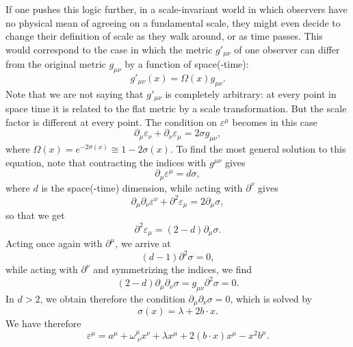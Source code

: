 \documentclass[a4paper,12pt]{article}
\numberwithin{equation}{section}
\begin{document}
If one pushes this logic further, in a scale-invariant world in which observers have no physical mean of agreeing on a fundamental scale, they might even decide to change their definition of scale as they walk around, or as time passes. This would correspond to the case in which the metric $g'_{\mu\nu}$ of one observer can differ from the original metric $g_{\mu\nu}$ by a function of space(-time):
\begin{equation}
	g'_{\mu\nu}(x) = \Omega(x) g_{\mu\nu}.
\end{equation}
Note that we are not saying that $g'_{\mu\nu}$ is completely arbitrary: at every point in space time it is related to the flat metric by a scale transformation. But the scale factor is different at every point.
The condition on $\varepsilon^\mu$ becomes in this case
\begin{equation}
	\partial_\mu \varepsilon_\nu
	+ \partial_\nu \varepsilon_\mu = 2 \sigma g_{\mu\nu},
	\label{eq:conformalkillingeq}
\end{equation}
where $\Omega(x) = e^{-2 \sigma(x)} \cong 1 - 2\sigma(x)$. To find the most general solution to this equation, note that contracting the indices with $g^{\mu\nu}$ gives
\begin{equation}
	\partial_\mu \varepsilon^\mu  = d \sigma,
\end{equation}
where $d$ is the space(-time) dimension,
while acting with $\partial^\nu$ gives
\begin{equation}
	\partial_\mu \partial_\nu \varepsilon^\nu
	+ \partial^2 \varepsilon_\mu
	= 2 \partial_\mu\sigma,
\end{equation}
so that we get
\begin{equation}
	\partial^2 \varepsilon_\mu
	= (2 - d) \partial_\mu\sigma.
\end{equation}
Acting once again with $\partial^\mu$, we arrive at 
\begin{equation}
	(d - 1) \partial^2 \sigma = 0,
\end{equation}
while acting with $\partial^\nu$ and symmetrizing the indices, we find
\begin{equation}
	(2 - d) \partial_\mu\partial_\nu \sigma
	= g_{\mu\nu} \partial^2 \sigma
	= 0.
\end{equation}
In $d > 2$, we obtain therefore the condition $\partial_\mu \partial_\nu \sigma = 0$, which is solved by 
\begin{equation}
	\sigma(x) = \lambda + 2 b \cdot x.
\end{equation}
We have therefore
\begin{equation}
	\varepsilon^\mu = a^\mu + \omega^\mu_{~\nu} x^\nu
	+ \lambda x^\mu
	+ 2 (b \cdot x) x^\mu - x^2 b^\mu.
	\label{eq:conformalkillingvec}
\end{equation}
\end{document}
